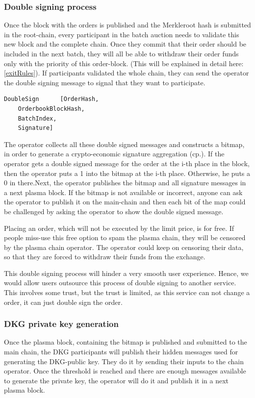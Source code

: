 \documentclass[11pt,parskip=full]{scrartcl}%
\begin{document}
\subsubsection{Double signing process}
Once the block with the orders is published and the Merkleroot hash is submitted in the root-chain, every participant in the batch auction needs to validate this new block and the complete chain. 
Once they commit that their order should be included in the next batch, they will all be able to withdraw their order funds only with the priority of this order-block. 
(This will be explained in detail here: \ref{exitRules}). 
If participants validated the whole chain, they can send the operator the double signing message to signal that they want to participate. 
\begin{lstlisting}
DoubleSign      [OrderHash,
    OrderbookBlockHash,
    BatchIndex,
    Signature]
\end{lstlisting}

The operator collects all these double signed messages and constructs a bitmap, in order to generate a crypto-economic signature aggregation (cp.\cite{sig}). 
If the operator gets a double signed message for the order at the i-th place in the block, then the operator puts a 1 into the bitmap at the i-th place. 
Otherwise, he puts a 0 in there.Next, the operator publishes the bitmap and all signature messages in a next plasma block. 
If the bitmap is not available or incorrect, anyone can ask the operator to publish it on the main-chain and then each bit of the map could be challenged by asking the operator to show the double signed message. 

Placing an order, which will not be executed by the limit price, is for free. 
If people miss-use this free option to spam the plasma chain, they will be censored by the plasma chain operator. 
The operator could keep on censoring their data, so that they are forced to withdraw their funds from the exchange. 

This double signing process will hinder a very smooth user experience. 
Hence, we would allow users outsource this process of double signing to another service. 
This involves some trust, but the trust is limited, as this service can not change a order, it can just double sign the order. 

\subsubsection{DKG private key generation}
Once the plasma block, containing the bitmap is published and submitted to the main chain, the DKG participants will publish their hidden messages used for generating the DKG-public key. 
They do it by sending their inputs to the chain operator.
Once the threshold is reached and there are enough messages available to generate the private key, the operator will do it and publish it in a next plasma block. 
\end{document}
